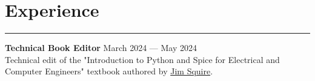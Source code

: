 \documentclass[a4paper,11pt]{article}
\begin{document}
\vspace{-0.8cm}
\section*{\hspace*{1em} Experience}
\vspace{-0.27cm}
\hrule
\vspace{0.3cm}
\textbf{\hspace*{1em}Technical Book Editor} 
\hfill March 2024 — May 2024 \\
Technical edit of the "Introduction to Python and Spice for Electrical and Computer Engineers" textbook authored by \href{https://www.jimsquire.com/}{Jim Squire}. \\

\vspace{-0.8cm}
\end{document}
